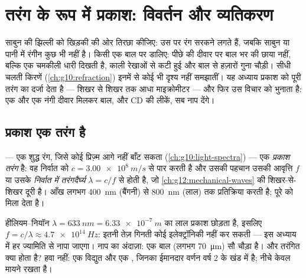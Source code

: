\chapter{तरंग के रूप में प्रकाश: विवर्तन और व्यतिकरण}\label{ch:g12:light-as-wave}

साबुन की झिल्ली को खिड़की की ओर तिरछा कीजिए: उस पर रंग सरकने लगते हैं, जबकि
साबुन या पानी में रंगीन कुछ भी नहीं है। किसी एक बाल पर  डालिए:
पीछे की दीवार पर बाल भर की छाया नहीं, बल्कि एक चमकीली धारी दिखती है,
काली रेखाओं से कटी हुई और बाल से हज़ारों गुना चौड़ी। सीधी चलती किरणें
(\cref{ch:g10:refraction}) इनमें से कोई भी दृश्य नहीं समझातीं। यह अध्याय प्रकाश को पूरी
तरंग का दर्जा देता है --- शिखर से शिखर तक आधा माइक्रोमीटर --- और फिर
उस विचार को भुनाता है: एक  और एक नंगी दीवार मिलकर बाल, 
और CD की लीकें, सब नाप देंगे।

\section{प्रकाश एक तरंग है}

\begin{definition}[प्रकाश तरंगें]\label{def:g12:light-as-wave:lightwave}
 --- एक शुद्ध रंग, जिसे कोई प्रिज़्म आगे नहीं बाँट सकता
(\cref{ch:g10:light-spectra}) --- एक  \emph{प्रकाश तरंग} है: वह
निर्वात को $c = \qty{3.00e8}{m/s}$ से पार करती है और उसकी पहचान उसकी आवृत्ति $f$ या
उसके \emph{निर्वात में तरंगदैर्घ्य} $\lambda = c/f$ से
होती है, जो \cref{ch:g12:mechanical-waves} की शिखर-से-शिखर दूरी है। आँख लगभग \qty{400}{nm} (बैंगनी) से
\qty{800}{nm} (लाल) तक प्रतिक्रिया करती है;  पूरे 
को मिला देता है।
\end{definition}

\begin{example}[परिमाण की कोटियाँ]\label{ex:g12:light-as-wave:orders}
हीलियम--नियॉन  $\lambda = \qty{633}{nm} =
\qty{6.33e-7}{m}$ का लाल प्रकाश छोड़ता है, इसलिए $f = c/\lambda \approx \qty{4.7e14}{Hz}$: इतनी
तेज़ गिनती कोई इलेक्ट्रॉनिकी नहीं कर सकती --- इस अध्याय में हर
 ज्यामिति से नापा जाएगा। नाप का अंदाज़ा: एक बाल (लगभग
\qty{70}{\micro m}) सौ  चौड़ा है। और तरंगित क्या होता है? हवा
नहीं: एक विद्युत और एक , जिनका ईमानदार वर्णन वर्ष 2 के
खंड में है; नीचे केवल  मायने रखता है।
\end{example}

